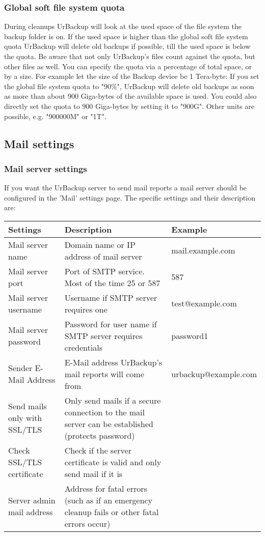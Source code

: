 \documentclass[a4paper,10pt]{article}
\begin{document}
\subsubsection{Global soft file system quota}
\label{global_soft_fs_quota}

During cleanups UrBackup will look at the used space of the file system the backup folder is on. If the used space is higher than the global soft file system quota UrBackup will delete old backups if possible, till the used space is below the quota. Be aware that not only UrBackup's files count against the quota, but other files as well.
You can specify the quota via a percentage of total space, or by a size. For example let the size of the Backup device be 1 Tera-byte:
If you set the global file system quota to "90\%", UrBackup will delete old backups as soon as more than about 900 Giga-bytes of the available space is used. You could also directly set the quota to 900 Giga-bytes by setting it to "900G". Other units are possible, e.g. "900000M" or "1T".

\subsection{Mail settings}

\subsubsection{Mail server settings}
\label{mail_server_settings}

If you want the UrBackup server to send mail reports a mail server should be configured in the 'Mail' settings page. The specific settings and their description are:

\begin{longtable}{|p{}|p{}|p{}|}
\hline
Settings  & Description & Example\\
\hline\hline
Mail server name & Domain name or IP address of mail server & mail.example.com \\
\hline
Mail server port & Port of SMTP service. Most of the time 25 or 587 & 587 \\
\hline
Mail server username & Username if SMTP server requires one & test@example.com \\
\hline
Mail server password & Password for user name if SMTP server requires credentials & password1 \\
\hline
Sender E-Mail Address & E-Mail address UrBackup's mail reports will come from & urbackup@example.com \\
\hline
Send mails only with SSL/TLS & Only send mails if a secure connection to the mail server can be established (protects password) & \\
\hline
Check SSL/TLS certificate & Check if the server certificate is valid and only send mail if it is & \\
\hline
Server admin mail address & Address for fatal errors (such as if an emergency cleanup fails or other fatal errors occur) & \\
\hline
\end{longtable}
\end{document}
